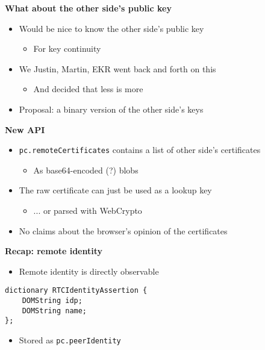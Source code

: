 \documentclass[helvetica]{seminar}
\newcommand{\heading}[1]{%
  \begin{center} 
    \large\bf 
    #1 
  \end{center} 
  \vspace{.4 in}}
\begin{document}
\begin{slide}
\heading{What about the other side's public key}

\begin{itemize}
\item Would be nice to know the other side's public key
  \begin{itemize}
    \item For key continuity
  \end{itemize}

\item We {Justin, Martin, EKR} went back and forth on this
  \begin{itemize}
  \item And decided that less is more
  \end{itemize}

\item Proposal: a binary version of the other side's keys
\end{itemize}

\end{slide}


\begin{slide}
\heading{New API}

\begin{itemize}
\item \verb^pc.remoteCertificates^ contains a list of other side's certificates
  \begin{itemize}
    \item As base64-encoded (?) blobs
  \end{itemize}

\item The raw certificate can just be used as a lookup key
  \begin{itemize}
    \item ... or parsed with WebCrypto
  \end{itemize}

\item No claims about the browser's opinion of the certificates
\end{itemize}
\end{slide}


\begin{slide}
\heading{Recap: remote identity}

\begin{itemize}
\item Remote identity is directly observable
\end{itemize}

\begin{verbatim}
dictionary RTCIdentityAssertion {
    DOMString idp;
    DOMString name;
};
\end{verbatim}

\begin{itemize}
\item Stored as \verb^pc.peerIdentity^
\end{itemize}

\end{slide}
\end{document}
